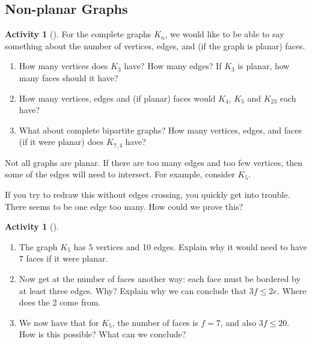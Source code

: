 \documentclass[10pt,]{book}
\theoremstyle{plain}
\theoremstyle{definition}
\theoremstyle{definition}
\theoremstyle{definition}
\newtheorem{activity}[project]{Activity}
\numberwithin{equation}{chapter}
\newcommand{\vtx}[2]{node[fill,circle,inner sep=0pt, minimum size=4pt,label=#1:#2]{}}
\renewcommand{\v}{\vtx{above}{}}
\begin{document}
\subsection[{Non-planar Graphs}]{Non-planar Graphs}\label{subsection-7}
\begin{activity}[]\label{activity-21}
\hypertarget{p-261}{}%
For the complete graphs \(K_n\), we would like to be able to say something about the number of vertices, edges, and (if the graph is planar) faces.%
\begin{enumerate}[font=\bfseries,label=(\alph*),ref=\alph*]
\item\label{task-31} \hypertarget{p-262}{}%
How many vertices does \(K_3\) have? How many edges?  If \(K_3\) is planar, how many faces should it have?%
\item\label{task-32} \hypertarget{p-263}{}%
How many vertices, edges and (if planar) faces would \(K_4\), \(K_5\) and \(K_{23}\) each have?%
\item\label{task-33} \hypertarget{p-264}{}%
What about complete bipartite graphs? How many vertices, edges, and faces (if it were planar) does \(K_{7,4}\) have?%
\end{enumerate}
\end{activity}
\hypertarget{p-265}{}%
Not all graphs are planar. If there are too many edges and too few vertices, then some of the edges will need to intersect. For example, consider \(K_5\).%
\begin{sidebyside}{1}{0.4}{0.4}{0}
\begin{sbspanel}{0.2}
\resizebox{\linewidth}{!}{{
\begin{tikzpicture}
          \foreach \x in {0,...,4}
          \draw (\x*72+18:1) \v -- (\x*72+90:1) -- (\x*72-54:1);
        \end{tikzpicture}
}
}
\end{sbspanel}
\end{sidebyside}
\par
\hypertarget{p-266}{}%
If you try to redraw this without edges crossing, you quickly get into trouble. There seems to be one edge too many. How could we prove this?%
\begin{activity}[]\label{activity-22}
\leavevmode%
\begin{enumerate}[font=\bfseries,label=(\alph*),ref=\alph*]
\item\label{task-34} \hypertarget{p-267}{}%
The graph \(K_5\) has \(5\) vertices and 10 edges.  Explain why it would need to have \(7\) faces if it were planar.%
\item\label{task-35} \hypertarget{p-269}{}%
Now get at the number of faces another way: each face must be bordered by at least three edges.  Why?  Explain why we can conclude that \(3f \le 2e\).  Where does the 2 come from.%
\item\label{task-36} \hypertarget{p-271}{}%
We now have that for \(K_5\), the number of faces is \(f = 7\), and also \(3f \le 20\).  How is this possible?  What can we conclude?%
\end{enumerate}
\end{activity}
\end{document}
